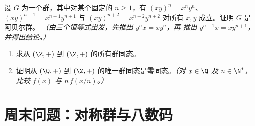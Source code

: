 \begin{exercise}[$\star\star\star$]\label{exo:b1:structures:11}
设 $G$ 为一个群，其中对某个固定的 $n \geq 1$，有 $(xy)^n =
x^n y^n$、$(xy)^{n+1} = x^{n+1}y^{n+1}$ 与 $(xy)^{n+2} =
x^{n+2}y^{n+2}$ 对所有 $x, y$ 成立。证明 $G$ 是阿贝尔群。
\emph{（由三个恒等式出发，先推出 $y^n x = x y^n$，再
推出 $y^{n+1} x = x y^{n+1}$，并得出结论。）}
\end{exercise}

\begin{exercise}[$\star\star$]\label{exo:b1:structures:12}
\begin{enumerate}
  \item 求从 $(\Z, +)$ 到 $(\Z, +)$ 的所有群同态。
  \item 证明从 $(\Q, +)$ 到
        $(\Z, +)$ 的唯一群同态是零同态。\emph{（对 $x \in \Q$ 及
        $n \in \N^*$，比较 $f(x)$ 与 $n\,f(x/n)$。）}
\end{enumerate}
\end{exercise}

\section{周末问题：对称群与八数码}

